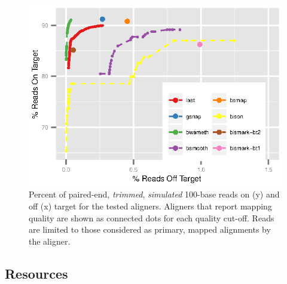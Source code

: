 \documentclass[12pt]{article}
\begin{document}
\begin{figure}[H]%
    \centerline{\includegraphics[width=125mm]{sim-trim-quals.eps}}
    \caption{Percent of paired-end, \emph{trimmed}, \emph{simulated} 100-base reads on (y) and off (x) target for the tested aligners. Aligners that report mapping quality are shown as connected dots for each quality cut-off. Reads are limited to those considered as primary, mapped alignments by the aligner.
}\label{suppfig:04}
\end{figure}

\subsection{Resources}
\end{document}
